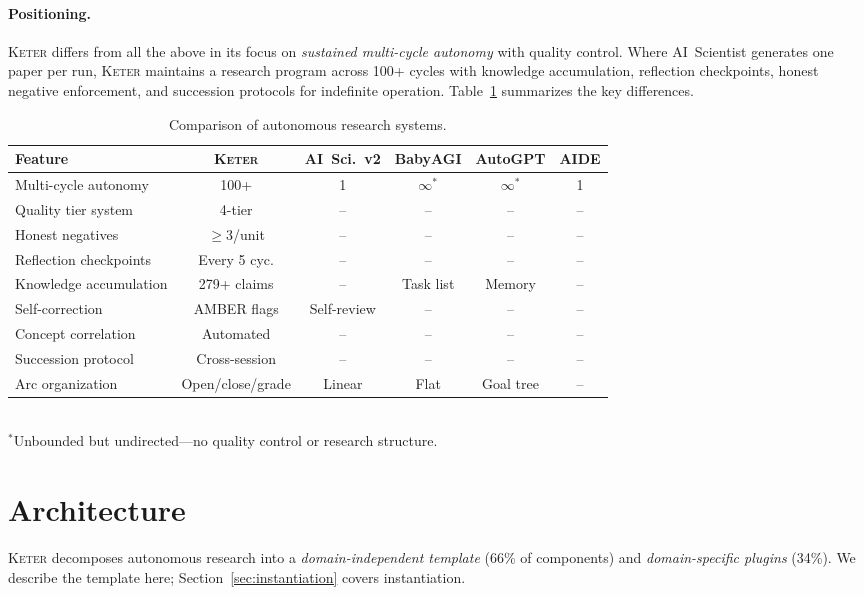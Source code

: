 \documentclass[11pt,a4paper]{article}
\newcommand{\keter}{\textsc{Keter}}
\begin{document}
\paragraph{Positioning.}
\keter{} differs from all the above in its focus on \emph{sustained multi-cycle
autonomy} with quality control. Where AI~Scientist generates one paper per run,
\keter{} maintains a research program across 100+ cycles with knowledge accumulation,
reflection checkpoints, honest negative enforcement, and succession protocols for
indefinite operation. Table~\ref{tab:comparison} summarizes the key differences.

\begin{table}[t]
\centering
\caption{Comparison of autonomous research systems.}
\label{tab:comparison}
\small
\begin{tabular}{@{}lccccc@{}}
\toprule
Feature & \keter{} & AI~Sci.~v2 & BabyAGI & AutoGPT & AIDE \\
\midrule
Multi-cycle autonomy & 100+ & 1 & $\infty^*$ & $\infty^*$ & 1 \\
Quality tier system  & 4-tier & -- & -- & -- & -- \\
Honest negatives     & $\geq$3/unit & -- & -- & -- & -- \\
Reflection checkpoints & Every 5 cyc. & -- & -- & -- & -- \\
Knowledge accumulation & 279+ claims & -- & Task list & Memory & -- \\
Self-correction      & AMBER flags & Self-review & -- & -- & -- \\
Concept correlation  & Automated & -- & -- & -- & -- \\
Succession protocol  & Cross-session & -- & -- & -- & -- \\
Arc organization     & Open/close/grade & Linear & Flat & Goal tree & -- \\
\bottomrule
\end{tabular}
\\[2pt]
{\footnotesize $^*$Unbounded but undirected---no quality control or research structure.}
\end{table}

\section{Architecture}
\label{sec:architecture}

\keter{} decomposes autonomous research into a \emph{domain-independent template}
(66\% of components) and \emph{domain-specific plugins} (34\%). We describe the
template here; Section~\ref{sec:instantiation} covers instantiation.
\end{document}
